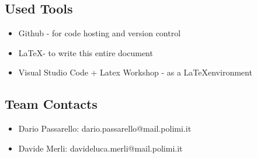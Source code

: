 \subsection{Used Tools}
\begin{itemize}
    \item Github - for code hosting and version control
    \item \LaTeX \space  - to write this entire document
    \item Visual Studio Code + Latex Workshop - as a \LaTeX \space environment
\end{itemize}

\subsection{Team Contacts}
\begin{itemize}
    \item Dario Passarello: dario.passarello@mail.polimi.it
    \item Davide Merli: davideluca.merli@mail.polimi.it
\end{itemize}

\clearpage